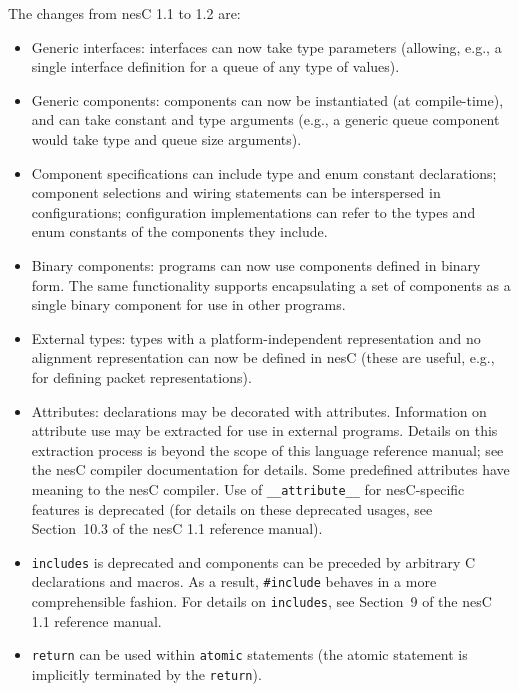 \documentclass[11pt,letterpaper]{article}
\newcommand{\kw}[1]{{\tt #1}}
\newcommand{\nesc}{nesC\xspace}
\begin{document}
The changes from \nesc 1.1 to 1.2 are:
\begin{itemize}
\item Generic interfaces: interfaces can now take type parameters
(allowing, e.g., a single interface definition for a queue of any type of
values).

\item Generic components: components can now be instantiated (at
compile-time), and can take constant and type arguments (e.g., a generic queue
component would take type and queue size arguments).

\item Component specifications can include type and enum constant
declarations; component selections and wiring statements can be
interspersed in configurations; configuration implementations can refer to
the types and enum constants of the components they include.

\item Binary components: programs can now use components defined in 
binary form. The same functionality supports encapsulating a set of
components as a single binary component for use in other programs.

\item External types: types with a platform-independent representation
and no alignment representation can now be defined in nesC (these
are useful, e.g., for defining packet representations).

\item Attributes: declarations may be decorated with attributes. 
Information on attribute use may be extracted for use in external
programs. Details on this extraction process is beyond the scope
of this language reference manual; see the nesC compiler documentation
for details. Some predefined attributes have meaning to the nesC
compiler. Use of \kw{\_\_attribute\_\_} for nesC-specific features
is deprecated (for details on these deprecated usages, see Section~10.3
of the nesC 1.1 reference manual).

\item \kw{includes} is deprecated and components can be preceded by
arbitrary C declarations and macros. As a result, \kw{\#include} behaves
in a more comprehensible fashion. For details on \kw{includes}, see
Section~9 of the nesC 1.1 reference manual.

\item \kw{return} can be used within \kw{atomic} statements (the atomic
statement is implicitly terminated by the \kw{return}).
\end{itemize}
\end{document}
